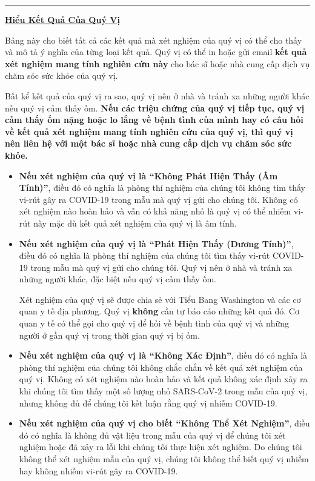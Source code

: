 \documentclass[10pt]{article}
\newcommand{\PageLine}{\rule{\textwidth}{0.25mm}}
\begin{document}
\PageLine
\bigskip

\large \underline{\textbf{Hiểu Kết Quả Của Quý Vị}}

Bảng này cho biết tất cả các kết quả mà xét nghiệm của quý vị có thể cho thấy và
mô tả ý nghĩa của từng loại kết quả. Quý vị có thể in hoặc gửi email
\textbf{kết quả xét nghiệm mang tính nghiên cứu này} cho bác sĩ hoặc nhà cung
cấp dịch vụ chăm sóc sức khỏe của quý vị.

Bất kể kết quả của quý vị ra sao, quý vị nên ở nhà và tránh xa những người khác
nếu quý vị cảm thấy ốm. \textbf{Nếu các triệu chứng của quý vị tiếp tục, quý vị
cảm thấy ốm nặng hoặc lo lắng về bệnh tình của mình hay có câu hỏi về kết quả
xét nghiệm mang tính nghiên cứu của quý vị, thì quý vị nên liên hệ với một bác
sĩ hoặc nhà cung cấp dịch vụ chăm sóc sức khỏe.}

\begin{itemize}


\item

  \textbf{Nếu xét nghiệm của quý vị là ``Không Phát Hiện Thấy (Âm Tính)''}, điều
  đó có nghĩa là phòng thí nghiệm của chúng tôi không tìm thấy vi-rút gây ra
  COVID-19 trong mẫu mà quý vị gửi cho chúng tôi. Không có xét nghiệm nào hoàn
  hảo và vẫn có khả năng nhỏ là quý vị có thể nhiễm vi-rút này mặc dù kết quả
  xét nghiệm của quý vị là âm tính.

\item

  \textbf{Nếu xét nghiệm của quý vị là ``Phát Hiện Thấy (Dương Tính)''}, điều đó
  có nghĩa là phòng thí nghiệm của chúng tôi tìm thấy vi-rút COVID-19 trong mẫu
  mà quý vị gửi cho chúng tôi. Quý vị nên ở nhà và tránh xa những người khác,
  đặc biệt nếu quý vị cảm thấy ốm.

  Xét nghiệm của quý vị sẽ được chia sẻ với Tiểu Bang Washington và các cơ quan
  y tế địa phương. Quý vị \textbf{không} cần tự báo cáo những kết quả đó. Cơ
  quan y tế có thể gọi cho quý vị để hỏi về bệnh tình của quý vị và những người
  ở gần quý vị trong thời gian quý vị bị ốm.

\item

  \textbf{Nếu xét nghiệm của quý vị là ``Không Xác Định''}, điều đó có nghĩa là
  phòng thí nghiệm của chúng tôi không chắc chắn về kết quả xét nghiệm của quý
  vị. Không có xét nghiệm nào hoàn hảo và kết quả không xác định xảy ra khi
  chúng tôi tìm thấy một số lượng nhỏ SARS-CoV-2 trong mẫu của quý vị, nhưng
  không đủ để chúng tôi kết luận rằng quý vị nhiễm COVID-19.

\item

  \textbf{Nếu xét nghiệm của quý vị cho biết ``Không Thể Xét Nghiệm''}, điều đó
  có nghĩa là không đủ vật liệu trong mẫu của quý vị để chúng tôi xét nghiệm
  hoặc đã xảy ra lỗi khi chúng tôi thực hiện xét nghiệm. Do chúng tôi không thể
  xét nghiệm mẫu của quý vị, chúng tôi không thể biết quý vị nhiễm hay không
  nhiễm vi-rút gây ra COVID-19.

\end{itemize}
\end{document}
